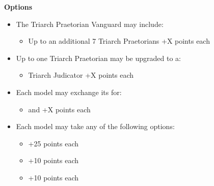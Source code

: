 \begin{minipage}[t]{0.72\textwidth}
	\vspace*{2em}
	\textbf{Options}
	\begin{itemize}
		\item The Triarch Praetorian Vanguard may include:
		\begin{itemize}
			\item Up to an additional 7 Triarch Praetorians \dotfill +X points each
		\end{itemize}
		\item Up to one Triarch Praetorian may be upgraded to a:
		\begin{itemize}
			\item Triarch Judicator \dotfill +X points each
		\end{itemize}
		\item Each model may exchange its  for:
		\begin{itemize}
			\item {} and  \dotfill +X points each
		\end{itemize}
		\item Each model may take any of the following options:
		\begin{itemize}
			\item {} \dotfill +25 points each
			\item {} \dotfill +10 points each
			\item {} \dotfill +10 points each
		\end{itemize}
	\end{itemize}
\end{minipage}
\hspace{0.5em}

\newpage
\subsubsection[Ophydian Destroyer Vanguard]{}

